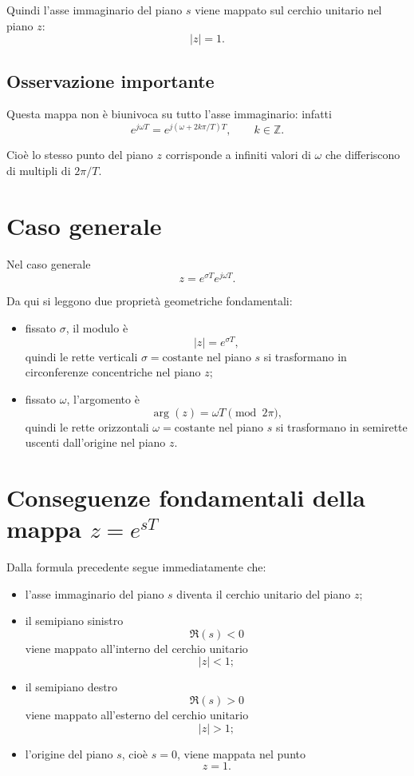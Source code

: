 Quindi l'asse immaginario del piano \(s\) viene mappato sul cerchio unitario nel piano \(z\):
\[
|z|=1.
\]

\subsection{Osservazione importante}

Questa mappa non è biunivoca su tutto l'asse immaginario:
infatti
\[
e^{j\omega T}=e^{j(\omega+2k\pi/T)T},
\qquad k\in\mathbb{Z}.
\]

Cioè lo stesso punto del piano \(z\) corrisponde a infiniti valori di \(\omega\)
che differiscono di multipli di \(2\pi/T\).

\section{Caso generale}

Nel caso generale
\[
z=e^{\sigma T}e^{j\omega T}.
\]

Da qui si leggono due proprietà geometriche fondamentali:

\begin{itemize}
    \item fissato \(\sigma\), il modulo è
    \[
    |z|=e^{\sigma T},
    \]
    quindi le rette verticali \(\sigma=\text{costante}\) nel piano \(s\)
    si trasformano in circonferenze concentriche nel piano \(z\);

    \item fissato \(\omega\), l'argomento è
    \[
    \arg(z)=\omega T \pmod{2\pi},
    \]
    quindi le rette orizzontali \(\omega=\text{costante}\) nel piano \(s\)
    si trasformano in semirette uscenti dall'origine nel piano \(z\).
\end{itemize}

\section{Conseguenze fondamentali della mappa \(z=e^{sT}\)}

Dalla formula precedente segue immediatamente che:

\begin{itemize}
    \item l'asse immaginario del piano \(s\) diventa il cerchio unitario del piano \(z\);
    \item il semipiano sinistro
    \[
    \Re(s)<0
    \]
    viene mappato all'interno del cerchio unitario
    \[
    |z|<1;
    \]
    \item il semipiano destro
    \[
    \Re(s)>0
    \]
    viene mappato all'esterno del cerchio unitario
    \[
    |z|>1;
    \]
    \item l'origine del piano \(s\), cioè \(s=0\), viene mappata nel punto
    \[
    z=1.
    \]
\end{itemize}

